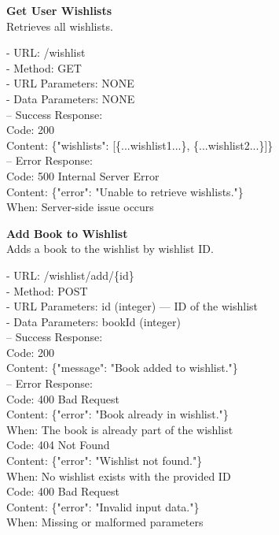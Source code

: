 \begin{flushleft}
    \textbf{Get User Wishlists} \\
    Retrieves all wishlists.

    - URL: /wishlist \\
    - Method: GET \\
    - URL Parameters: NONE \\
    - Data Parameters: NONE \\
    – Success Response: \\
    Code: 200 \\
    Content: \{"wishlists": [\{...wishlist1...\}, \{...wishlist2...\}]\} \\
    – Error Response: \\
    Code: 500 Internal Server Error \\
    Content: \{"error": "Unable to retrieve wishlists."\} \\
    When: Server-side issue occurs
\end{flushleft}

\begin{flushleft}
    \textbf{Add Book to Wishlist} \\
    Adds a book to the wishlist by wishlist ID.

    - URL: /wishlist/add/\{id\} \\
    - Method: POST \\
    - URL Parameters: id (integer) — ID of the wishlist \\
    - Data Parameters: bookId (integer) \\
    – Success Response: \\
    Code: 200 \\
    Content: \{"message": "Book added to wishlist."\} \\
    – Error Response: \\
    Code: 400 Bad Request \\
    Content: \{"error": "Book already in wishlist."\} \\
    When: The book is already part of the wishlist \\
    Code: 404 Not Found \\
    Content: \{"error": "Wishlist not found."\} \\
    When: No wishlist exists with the provided ID \\
    Code: 400 Bad Request \\
    Content: \{"error": "Invalid input data."\} \\
    When: Missing or malformed parameters
\end{flushleft}

